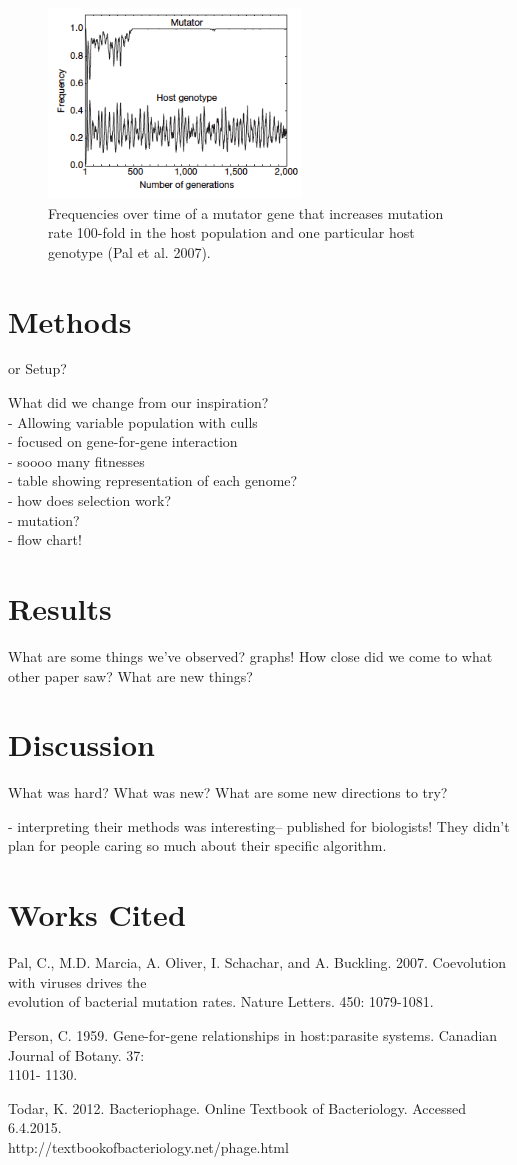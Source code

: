 \documentclass[11pt, oneside]{article}
\begin{document}
\begin{figure}[H]
	\centering
	\includegraphics[width=0.6\textwidth]{figure2.png}
	\caption{Frequencies over time of a mutator gene that increases mutation rate 100-fold in the host population and one particular host genotype (Pal et al. 2007).}
\end{figure}

\section{Methods}
or Setup? 

What did we change from our inspiration?
\\- Allowing variable population with culls
\\- focused on gene-for-gene interaction
\\- soooo many fitnesses
\\- table showing representation of each genome?
\\- how does selection work?
\\- mutation?
\\- flow chart!

\section{Results}
What are some things we've observed? graphs! How close did we come to what other paper saw? What are new things?

\section{Discussion}
What was hard? What was new? What are some new directions to try?

- interpreting their methods was interesting-- published for biologists! They didn't plan for people caring so much about their specific algorithm. 

\section{Works Cited}
Pal, C., M.D. Marcia, A. Oliver, I. Schachar, and A. Buckling. 2007. Coevolution with viruses drives the \\\-\hspace{0.75cm} evolution of bacterial mutation rates. Nature Letters. 450: 1079-1081.

Person, C. 1959. Gene-for-gene relationships in host:parasite systems. Canadian Journal of Botany. 37: \\\-\hspace{0.75cm} 1101- 1130.

Todar, K. 2012. Bacteriophage. Online Textbook of Bacteriology. Accessed 6.4.2015.\\\-\hspace{0.75cm} http://textbookofbacteriology.net/phage.html
\end{document}
